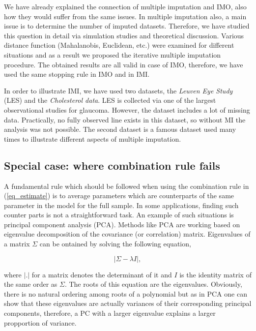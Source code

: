 \documentclass[11pt,a5paper,twoside]{book}
\begin{document}
We have already explained the connection of multiple imputation and IMO, also how they would suffer from the same issues. In multiple imputation also, a main issue is to determine the number of imputed datasets. Therefore, we have studied this question in detail via simulation studies and theoretical discussion. Various distance function (Mahalanobis, Euclidean, etc.) were examined for different situations and as a result we proposed the iterative multiple imputation procedure. The obtained results are all valid in case of IMO, therefore, we have used the same stopping rule in IMO and in IMI.

In order to illustrate IMI, we have used two datasets, the \emph{Leuven Eye Study} (LES) and the \emph{Cholesterol data}. LES is collected via one of the largest observational studies for glaucoma. However, the dataset includes a lot of missing data. Practically, no fully observed line exists in this dataset, so without MI the analysis was not possible. The second dataset is a famous dataset used many times to illustrate different aspects of multiple imputation.



\subsection{Special case: where combination rule fails}

A fundamental rule which should be followed when using the combination rule in (\ref{eq_estimate}) is to average parameters which are counterparts of the same parameter in the model for the full sample. In some applications, finding such counter parts is not a straightforward task. An example of such situations is principal component analysis (PCA). Methods like PCA are working based on eigenvalue decomposition of the covariance (or correlation) matrix. Eigenvalues of a matrix $\Sigma$ can be ontained by solving the following equation,

$$|\Sigma-\lambda I|,$$ 

where $|.|$ for a matrix denotes the determinant of it and $I$ is the identity matrix of the same order as $\Sigma$. The roots of this equation are the eigenvalues. Obviously, there is no natural ordering among roots of a polynomial but as in PCA one can show that \citep{mardiamultivariate} these eigenvalues are actually variances of their corresponding principal components, therefore, a PC with a larger eigenvalue explains a larger propportion of variance. 
\end{document}
